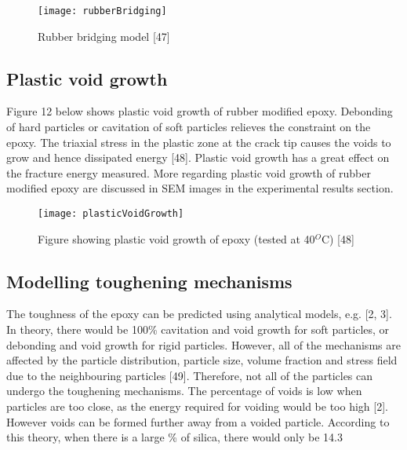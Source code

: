 \documentclass[numbers=noendperiod,chapterprefix=on]{icldt} %
\begin{document}
\begin{figure}[!htpb]
\centering
\texttt{[image: rubberBridging]}
\caption{Rubber bridging model [47]} %
\end{figure}

\subsection{Plastic void growth}
Figure 12 below shows plastic void growth of rubber modified epoxy. Debonding of hard particles or cavitation of soft particles relieves the constraint on the epoxy. The triaxial stress in the plastic zone at the crack tip causes the voids to grow and hence dissipated energy [48]. Plastic void growth has a great effect on the fracture energy measured. More regarding plastic void growth of rubber modified epoxy are discussed in SEM images in the experimental results section.

\begin{figure}[!htpb]
\centering
\texttt{[image: plasticVoidGrowth]}
\caption{Figure showing plastic void growth of epoxy (tested at 40$^O$C) [48]} %
\end{figure}

\subsection{Modelling toughening mechanisms}
The toughness of the epoxy can be predicted using analytical models, e.g. [2, 3]. In theory, there would be 100\% cavitation and void growth for soft particles, or debonding and void growth for rigid particles. However, all of the mechanisms are affected by the particle distribution, particle size, volume fraction and stress field due to the neighbouring particles [49]. Therefore, not all of the particles can undergo the toughening mechanisms. 
The percentage of voids is low when particles are too close, as the energy required for voiding would be too high [2]. However voids can be formed further away from a voided particle. According to this theory, when there is a large \% of silica, there would only be 14.3 %
\end{document}
